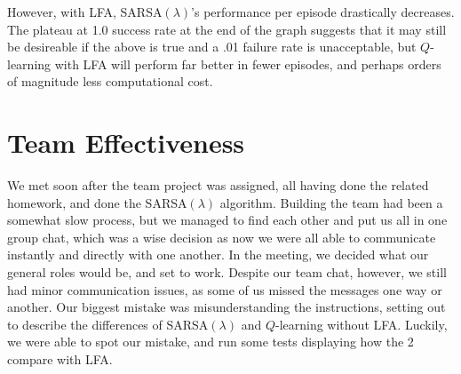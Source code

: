 \documentclass[10pt,conference]{IEEEtran}
\begin{document}
However, with LFA, SARSA\((\lambda)\)'s performance per episode drastically decreases. The plateau at 1.0 success rate at the end of the graph suggests that it may still be desireable if the above is true and a .01 failure rate is unacceptable, but \(Q\)-learning with LFA will perform far better in fewer episodes, and perhaps orders of magnitude less computational cost.

\label{sec:conclusion}

\section{Team Effectiveness}
We met soon after the team project was assigned, all having done the related homework, and done the SARSA\((\lambda)\) algorithm. Building the team had been a somewhat slow process, but we managed to find each other and put us all in one group chat, which was a wise decision as now we were all able to communicate instantly and directly with one another. In the meeting, we decided what our general roles would be, and set to work. Despite our team chat, however, we still had minor communication issues, as some of us missed the messages one way or another. Our biggest mistake was misunderstanding the instructions, setting out to describe the differences of SARSA\((\lambda)\) and \(Q\)-learning without LFA. Luckily, we were able to spot our mistake, and run some tests displaying how the 2 compare with LFA.
\label{sec:team}




\end{document}
